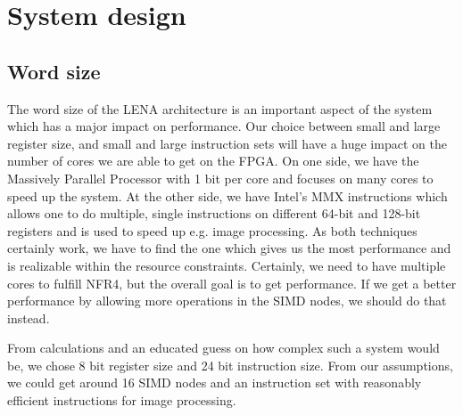\section{System design}
\begin{comment}
Choices made:\TODO{Unfinished braindump}
\begin{enumerate}
\item word width
\item instruction width/partitioning (different types of instructions?)
\item \ac{VGA} color switching in hardware
\end{enumerate}
\end{comment}

\subsection{Word size}

The word size of the \ac{LENA} architecture is an important aspect of the system which
has a major impact on performance. Our choice between small and large
register size, and
small and large instruction sets will have a huge impact on the number of cores
we are able to get on the \ac{FPGA}. On one side, we have the Massively Parallel
Processor\cite{potter1985mpp} with 1 bit per core and focuses on many cores to
speed up the system. At the other side, we have Intel's MMX instructions which
allows one to do multiple, single instructions on different 64-bit and 128-bit
registers and is used to speed up e.g. image processing\cite{lee2004h264}. As
both techniques certainly work, we have to find the one which gives us the most
performance and is realizable within the resource constraints. Certainly, we
need to have multiple cores to fulfill NFR4, but the overall goal is to get
performance. If we get a better performance by allowing more operations in the
\ac{SIMD} nodes, we should do that instead.

From calculations and an educated guess
on how complex such a system would be, we chose 8 bit register size and 24 bit instruction
size. From our assumptions, we could get around 16 \ac{SIMD} nodes and an
instruction set with reasonably efficient instructions for image processing.
